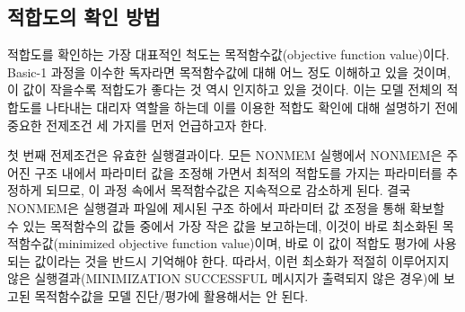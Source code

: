 \documentclass[
  11pt,
  krantz2, a4paper, twoside]{krantz}
\theoremstyle{definition}
\theoremstyle{definition}
\theoremstyle{definition}
\theoremstyle{remark}
\begin{document}

\hypertarget{uxc801uxd569uxb3c4uxc758-uxd655uxc778-uxbc29uxbc95}{%
\subsection{적합도의 확인 방법}\label{uxc801uxd569uxb3c4uxc758-uxd655uxc778-uxbc29uxbc95}}


적합도를 확인하는 가장 대표적인 척도는 목적함수값(objective function value)이다. Basic-1 과정을 이수한 독자라면 목적함수값에 대해 어느 정도 이해하고 있을 것이며, 이 값이 작을수록 적합도가 좋다는 것 역시 인지하고 있을 것이다. 이는 모델 전체의 적합도를 나타내는 대리자 역할을 하는데 이를 이용한 적합도 확인에 대해 설명하기 전에 중요한 전제조건 세 가지를 먼저 언급하고자 한다.

첫 번째 전제조건은 유효한 실행결과이다. 모든 NONMEM 실행에서 NONMEM은 주어진 구조 내에서 파라미터 값을 조정해 가면서 최적의 적합도를 가지는 파라미터를 추정하게 되므로, 이 과정 속에서 목적함수값은 지속적으로 감소하게 된다. 결국 NONMEM은 실행결과 파일에 제시된 구조 하에서 파라미터 값 조정을 통해 확보할 수 있는 목적함수의 값들 중에서 가장 작은 값을 보고하는데, 이것이 바로 최소화된 목적함수값(minimized objective function value)이며, 바로 이 값이 적합도 평가에 사용되는 값이라는 것을 반드시 기억해야 한다. 따라서, 이런 최소화가 적절히 이루어지지 않은 실행결과(MINIMIZATION SUCCESSFUL 메시지가 출력되지 않은 경우)에 보고된 목적함수값을 모델 진단/평가에 활용해서는 안 된다.
\end{document}
